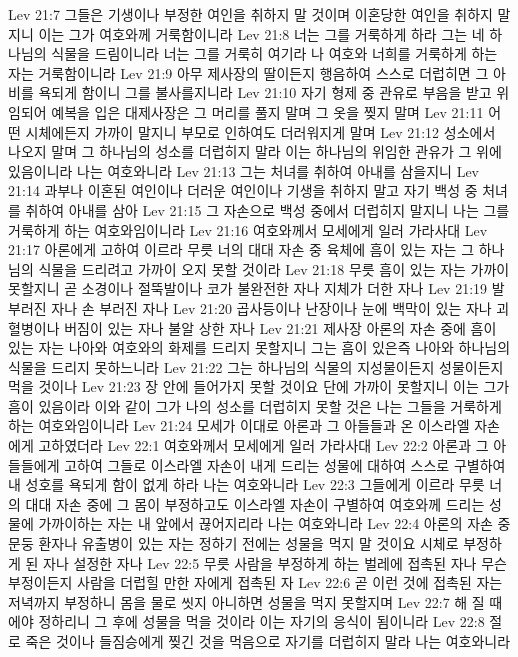 Lev 21:7  그들은 기생이나 부정한 여인을 취하지 말 것이며 이혼당한 여인을 취하지 말지니 이는 그가 여호와께 거룩함이니라
Lev 21:8  너는 그를 거룩하게 하라 그는 네 하나님의 식물을 드림이니라 너는 그를 거룩히 여기라 나 여호와 너희를 거룩하게 하는 자는 거룩함이니라
Lev 21:9  아무 제사장의 딸이든지 행음하여 스스로 더럽히면 그 아비를 욕되게 함이니 그를 불사를지니라
Lev 21:10  자기 형제 중 관유로 부음을 받고 위임되어 예복을 입은 대제사장은 그 머리를 풀지 말며 그 옷을 찢지 말며
Lev 21:11  어떤 시체에든지 가까이 말지니 부모로 인하여도 더러워지게 말며
Lev 21:12  성소에서 나오지 말며 그 하나님의 성소를 더럽히지 말라 이는 하나님의 위임한 관유가 그 위에 있음이니라 나는 여호와니라
Lev 21:13  그는 처녀를 취하여 아내를 삼을지니
Lev 21:14  과부나 이혼된 여인이나 더러운 여인이나 기생을 취하지 말고 자기 백성 중 처녀를 취하여 아내를 삼아
Lev 21:15  그 자손으로 백성 중에서 더럽히지 말지니 나는 그를 거룩하게 하는 여호와임이니라
Lev 21:16  여호와께서 모세에게 일러 가라사대
Lev 21:17  아론에게 고하여 이르라 무릇 너의 대대 자손 중 육체에 흠이 있는 자는 그 하나님의 식물을 드리려고 가까이 오지 못할 것이라
Lev 21:18  무릇 흠이 있는 자는 가까이 못할지니 곧 소경이나 절뚝발이나 코가 불완전한 자나 지체가 더한 자나
Lev 21:19  발 부러진 자나 손 부러진 자나
Lev 21:20  곱사등이나 난장이나 눈에 백막이 있는 자나 괴혈병이나 버짐이 있는 자나 불알 상한 자나
Lev 21:21  제사장 아론의 자손 중에 흠이 있는 자는 나아와 여호와의 화제를 드리지 못할지니 그는 흠이 있은즉 나아와 하나님의 식물을 드리지 못하느니라
Lev 21:22  그는 하나님의 식물의 지성물이든지 성물이든지 먹을 것이나
Lev 21:23  장 안에 들어가지 못할 것이요 단에 가까이 못할지니 이는 그가 흠이 있음이라 이와 같이 그가 나의 성소를 더럽히지 못할 것은 나는 그들을 거룩하게 하는 여호와임이니라
Lev 21:24  모세가 이대로 아론과 그 아들들과 온 이스라엘 자손에게 고하였더라
Lev 22:1  여호와께서 모세에게 일러 가라사대
Lev 22:2  아론과 그 아들들에게 고하여 그들로 이스라엘 자손이 내게 드리는 성물에 대하여 스스로 구별하여 내 성호를 욕되게 함이 없게 하라 나는 여호와니라
Lev 22:3  그들에게 이르라 무릇 너의 대대 자손 중에 그 몸이 부정하고도 이스라엘 자손이 구별하여 여호와께 드리는 성물에 가까이하는 자는 내 앞에서 끊어지리라 나는 여호와니라
Lev 22:4  아론의 자손 중 문둥 환자나 유출병이 있는 자는 정하기 전에는 성물을 먹지 말 것이요 시체로 부정하게 된 자나 설정한 자나
Lev 22:5  무릇 사람을 부정하게 하는 벌레에 접촉된 자나 무슨 부정이든지 사람을 더럽힐 만한 자에게 접촉된 자
Lev 22:6  곧 이런 것에 접촉된 자는 저녁까지 부정하니 몸을 물로 씻지 아니하면 성물을 먹지 못할지며
Lev 22:7  해 질 때에야 정하리니 그 후에 성물을 먹을 것이라 이는 자기의 응식이 됨이니라
Lev 22:8  절로 죽은 것이나 들짐승에게 찢긴 것을 먹음으로 자기를 더럽히지 말라 나는 여호와니라
